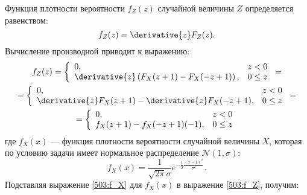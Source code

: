 \documentclass[12pt,a4paper]{article}
\begin{document}
    Функция плотности вероятности $f_Z(z)$ случайной величины $Z$ определяется равенством:
    \begin{equation}
        f_Z(z) = \derivative{z} F_Z(z) .
    \end{equation}
    Вычисление производной приводит к выражению:
    \begin{multline}
        \label{503:f_Z}
        f_Z(z)
        = \left \{
        \begin{array}{ll}
            0,                                                        & z < 0    \\
            \derivative{z} \left ( F_X(z + 1) - F_X(-z + 1) \right ), & 0 \leq z
        \end{array}
        \right . = \\
        = \left \{
        \begin{array}{ll}
            0,                                                      & z < 0    \\
            \derivative{z} F_X(z + 1) - \derivative{z} F_X(-z + 1), & 0 \leq z
        \end{array}
        \right . = \\
        = \left \{
        \begin{array}{ll}
            0,                            & z < 0    \\
            f_X(z + 1) - f_X(-z + 1)(-1), & 0 \leq z
        \end{array}
        \right .
    \end{multline}
    где $f_X(x)$ --- функция плотности вероятности случайной величины $X$, которая по условию задачи имеет нормальное распределение $\mathcal{N}(1,\sigma)$:
    \begin{equation}
        \label{503:f_X}
        f_X(x) = \frac{1}{\sqrt{2 \pi} \sigma} e^{-\frac{1}{2} \frac{\left ( x - 1 \right )^2}{\sigma^2}} .
    \end{equation}
    Подставляя выражение \eqref{503:f_X} для $f_X(x)$ в выражение \eqref{503:f_Z}, получим:
\end{document}
